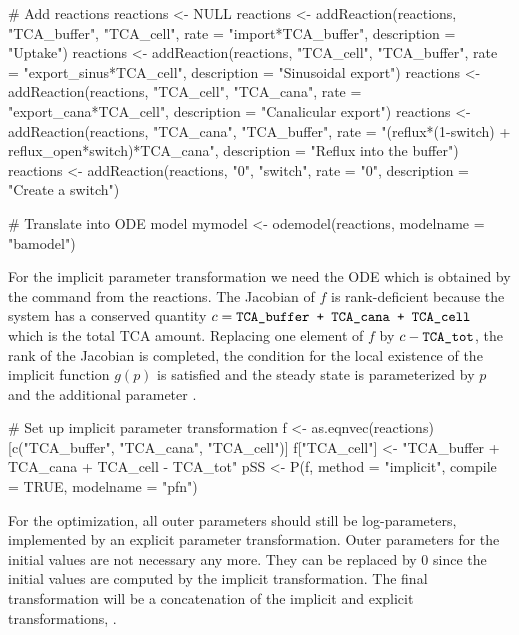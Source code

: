 \documentclass[article]{jss}
\begin{document}
\begin{CodeChunk}
\begin{CodeInput}
# Add reactions
reactions <- NULL
reactions <- addReaction(reactions, "TCA_buffer", "TCA_cell",
		 rate = "import*TCA_buffer",
		 description = "Uptake")
reactions <- addReaction(reactions, "TCA_cell", "TCA_buffer",
		 rate = "export_sinus*TCA_cell",
		 description = "Sinusoidal export")
reactions <- addReaction(reactions, "TCA_cell", "TCA_cana",
		 rate = "export_cana*TCA_cell",
		 description = "Canalicular export")
reactions <- addReaction(reactions, "TCA_cana", "TCA_buffer",
		 rate = "(reflux*(1-switch) + reflux_open*switch)*TCA_cana",
		 description = "Reflux into the buffer")
reactions <- addReaction(reactions, "0", "switch",
		 rate = "0",
		 description = "Create a switch")

# Translate into ODE model
mymodel <- odemodel(reactions, modelname = "bamodel")
\end{CodeInput}
\end{CodeChunk}

For the implicit parameter transformation we need the ODE which is obtained by the command  from the reactions. The Jacobian of $f$ is rank-deficient because the system has a conserved quantity $c = \verb!TCA_buffer + TCA_cana + TCA_cell!$ which is the total TCA amount. Replacing one element of $f$ by $c - \verb!TCA_tot!$, the rank of the Jacobian is completed, the condition for the local existence of the implicit function $g(p)$ is satisfied and the steady state is parameterized by $p$ and the additional parameter .

\begin{CodeChunk}
\begin{CodeInput}
# Set up implicit parameter transformation
f <- as.eqnvec(reactions)[c("TCA_buffer", "TCA_cana", "TCA_cell")]
f["TCA_cell"] <- "TCA_buffer + TCA_cana + TCA_cell - TCA_tot"
pSS <- P(f, method = "implicit",
         compile = TRUE, modelname = "pfn")
\end{CodeInput}
\end{CodeChunk}

For the optimization, all outer parameters should still be log-parameters, implemented by an explicit parameter transformation. Outer parameters for the initial values are not necessary any more. They can be replaced by 0 since the initial values are computed by the implicit transformation. The final transformation will be a concatenation of the implicit and explicit transformations, .
\end{document}
